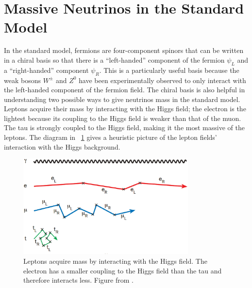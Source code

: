 \section{Massive Neutrinos in the Standard Model}
\label{sec:mass}

In the standard model, fermions are four-component spinors that can be written in a chiral basis so that there is a ``left-handed'' component of the fermion $\psi_L$ and a ``right-handed'' component $\psi_R$.  This is a particularly useful basis because the weak bosons $W^{\pm}$ and $Z^0$ have been experimentally observed to only interact with the left-handed component of the fermion field.  The chiral basis is also helpful in understanding two possible ways to give neutrinos mass in the standard model.  Leptons acquire their mass by interacting with the Higgs field; the electron is the lightest because its coupling to the Higgs field is weaker than that of the muon.  The tau is strongly coupled to the Higgs field, making it the most massive of the leptons.  The diagram in {\fig}~\ref{fig:leptonMass} gives a heuristic picture of the lepton fields' interaction with the Higgs background.  
\begin{figure}[htp]
\centering
\includegraphics[width=0.8\textwidth]{figures/leptonMass.eps}
\caption{Leptons acquire mass by interacting with the Higgs field.  The electron has a smaller coupling to the Higgs field than the tau and therefore interacts less.  Figure from \cite{neutrinoMass}.}
\label{fig:leptonMass}
\end{figure}
